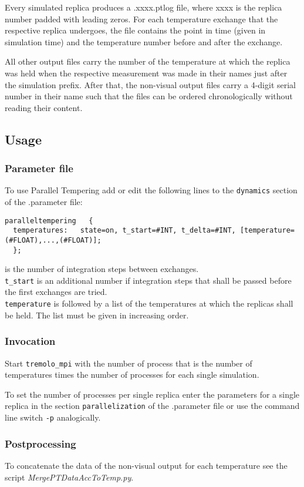 Every simulated replica produces a .xxxx.ptlog file, where xxxx is the replica number padded with leading zeros.
For each temperature exchange that the respective replica undergoes, the file contains the point in time (given in simulation time) and the temperature number before and after the exchange.

All other output files carry the number of the temperature at which the replica was held when the respective measurement was made in their names just after the simulation prefix.
After that, the non-visual output files carry a 4-digit serial number in their name such that the files can be ordered chronologically without reading their content.

\subsection{Usage}

\subsubsection{Parameter file}

To use Parallel Tempering add or edit the following lines to the {\tt dynamics} section of the .parameter file:

\begin{lstlisting}
paralleltempering   {
  temperatures:   state=on, t_start=#INT, t_delta=#INT, [temperature=(#FLOAT),...,(#FLOAT)];
  };
\end{lstlisting}

 is the number of integration steps between exchanges.\\
{\tt t\_start} is an additional number if integration steps that shall be passed before the first exchanges are tried.\\
{\tt temperature} is followed by a list of the temperatures at which the replicas shall be held. The list must be given in increasing order.

\subsubsection{Invocation}

Start {\tt tremolo\_mpi} with the number of process that is the number of temperatures times the number of processes for each single simulation.

To set the number of processes per single replica enter the parameters for a single replica in the section {\tt parallelization} of the .parameter file or use the command line switch {\tt -p} analogically.

\subsubsection{Postprocessing}

To concatenate the data of the non-visual output for each temperature see the script \textit{MergePTDataAccToTemp.py}.

